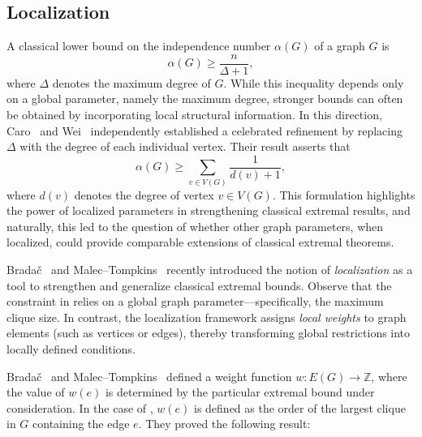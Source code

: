 \documentclass[pdflatex,sn-basic,Numbered]{sn-jnl}
\newtheorem{theorem}{Theorem}
\begin{document}
\subsection{Localization}

A classical lower bound on the independence number $\alpha(G)$ of a graph $G$ is 
\begin{equation*}
    \alpha(G) \geq \frac{n}{\Delta + 1},
\end{equation*}
where $\Delta$ denotes the maximum degree of $G$. While this inequality depends only on a global parameter, namely the maximum degree, stronger bounds can often be obtained by incorporating local structural information. In this direction, Caro~\cite{caro1979new} and Wei~\cite{wei1981lower} independently established a celebrated refinement by replacing $\Delta$ with the degree of each individual vertex. Their result asserts that
\begin{equation*}
    \alpha(G) \geq \sum_{v \in V(G)} \frac{1}{d(v) + 1},
\end{equation*}
where $d(v)$ denotes the degree of vertex $v \in V(G)$. This formulation highlights the power of localized parameters in strengthening classical extremal results, and naturally, this led to the question of whether other graph parameters, when localized, could provide comparable extensions of classical extremal theorems.

    Brada\v{c}~\cite{bradac} and Malec--Tompkins~\cite{DBLP:journals/ejc/MalecT23} recently introduced the notion of \emph{localization} as a tool to strengthen and generalize classical extremal bounds. Observe that the constraint in  relies on a global graph parameter—specifically, the maximum clique size. In contrast, the localization framework assigns \emph{local weights} to graph elements (such as vertices or edges), thereby transforming global restrictions into locally defined conditions.

Brada\v{c}~\cite{bradac} and Malec--Tompkins~\cite{DBLP:journals/ejc/MalecT23} defined a weight function $w : E(G) \rightarrow \mathbb{Z}$, where the value of $w(e)$ is determined by the particular extremal bound under consideration. In the case of , $w(e)$ is defined as the order of the largest clique in $G$ containing the edge $e$. They proved the following result:
\end{document}
